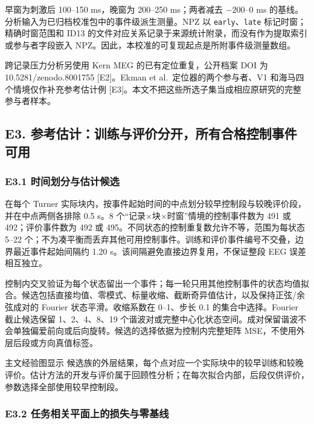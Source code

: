 \documentclass[11pt,a4paper]{article}
\begin{document}
早窗为刺激后 100–150 ms，晚窗为 200–250 ms；两者减去 \(-200\)–0 ms
的基线。分析输入为已归档校准包中的事件级派生测量。NPZ 以
\texttt{early}、\texttt{late} 标记时窗；精确时窗范围和 ID13
的文件对应关系记录于来源统计附录，而没有作为提取索引或参与者字段嵌入
NPZ。因此，本校准的可复现起点是所附事件级测量数组。

跨记录压力分析另使用 Kern MEG 的已有定位重复，公开档案 DOI 为
10.5281/zenodo.8001755 {[}E2{]}。Ekman et al.~定位器的两个参与者、V1
和海马四个情境仅作补充参考估计例
{[}E3{]}。本文不把这些所选子集当成相应原研究的完整参与者样本。

\subsection{E3.
参考估计：训练与评价分开，所有合格控制事件可用}\label{e3.-ux53c2ux8003ux4f30ux8ba1ux8badux7ec3ux4e0eux8bc4ux4ef7ux5206ux5f00ux6240ux6709ux5408ux683cux63a7ux5236ux4e8bux4ef6ux53efux7528}

\subsubsection{E3.1
时间划分与估计候选}\label{e3.1-ux65f6ux95f4ux5212ux5206ux4e0eux4f30ux8ba1ux5019ux9009}

在每个 Turner
实际块内，按事件起始时间的中点划分较早控制段与较晚评价段，并在中点两侧各排除
0.5 s。8 个“记录\(\times\)块\(\times\)时窗”情境的控制事件数为 491 或
492；评价事件数为 492 或 495。不同状态的控制重复数允许不等，范围为每状态
5–22
个；不为凑平衡而丢弃其他可用控制事件。训练和评价事件编号不交叠，边界最近事件起始间隔约
1.20 s。该间隔避免直接边界复用，不保证整段 EEG 误差相互独立。

控制内交叉验证为每个状态留出一个事件；每一轮只用其他控制事件的状态均值拟合。候选包括直接均值、零模式、标量收缩、截断奇异值估计，以及保持正弦/余弦成对的
Fourier 状态平滑。收缩系数在 0–1、步长 0.1 的集合中选择。Fourier
截止候选保留 1、2、4、8、19
个谐波对或完整中心化状态空间。成对保留谐波不会单独偏爱前向或后向旋转。候选的选择依据为控制内完整矩阵
MSE，不使用外层后段或方向真值标签。

主文经验图显示 
候选族的外层结果，每个点对应一个实际块中的较早训练和较晚评价。估计方法的开发与评价属于回顾性分析；在每次拟合内部，后段仅供评价，参数选择全部使用较早控制段。

\subsubsection{E3.2
任务相关平面上的损失与零基线}\label{e3.2-ux4efbux52a1ux76f8ux5173ux5e73ux9762ux4e0aux7684ux635fux5931ux4e0eux96f6ux57faux7ebf}
\end{document}
